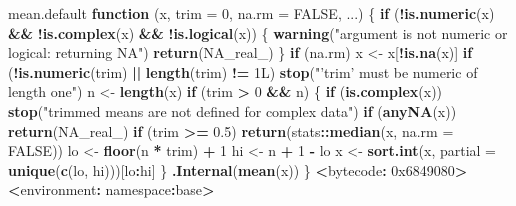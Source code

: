 \documentclass[10pt,a4paper]{book}
\newenvironment{Shaded}{\begin{snugshade}}{\end{snugshade}}
\newcommand{\KeywordTok}[1]{\textcolor[rgb]{0.13,0.29,0.53}{\textbf{#1}}}
\newcommand{\DataTypeTok}[1]{\textcolor[rgb]{0.13,0.29,0.53}{#1}}
\newcommand{\DecValTok}[1]{\textcolor[rgb]{0.00,0.00,0.81}{#1}}
\newcommand{\FloatTok}[1]{\textcolor[rgb]{0.00,0.00,0.81}{#1}}
\newcommand{\StringTok}[1]{\textcolor[rgb]{0.31,0.60,0.02}{#1}}
\newcommand{\OtherTok}[1]{\textcolor[rgb]{0.56,0.35,0.01}{#1}}
\newcommand{\ControlFlowTok}[1]{\textcolor[rgb]{0.13,0.29,0.53}{\textbf{#1}}}
\newcommand{\OperatorTok}[1]{\textcolor[rgb]{0.81,0.36,0.00}{\textbf{#1}}}
\newcommand{\ErrorTok}[1]{\textcolor[rgb]{0.64,0.00,0.00}{\textbf{#1}}}
\newcommand{\NormalTok}[1]{#1}
\begin{document}
\begin{Shaded}
\begin{Highlighting}[]
\NormalTok{mean.default}
\ControlFlowTok{function}\NormalTok{ (x, }\DataTypeTok{trim =} \DecValTok{0}\NormalTok{, }\DataTypeTok{na.rm =} \OtherTok{FALSE}\NormalTok{, ...) }
\NormalTok{\{}
    \ControlFlowTok{if}\NormalTok{ (}\OperatorTok{!}\KeywordTok{is.numeric}\NormalTok{(x) }\OperatorTok{&&}\StringTok{ }\OperatorTok{!}\KeywordTok{is.complex}\NormalTok{(x) }\OperatorTok{&&}\StringTok{ }\OperatorTok{!}\KeywordTok{is.logical}\NormalTok{(x)) \{}
        \KeywordTok{warning}\NormalTok{(}\StringTok{"argument is not numeric or logical: returning NA"}\NormalTok{)}
        \KeywordTok{return}\NormalTok{(}\OtherTok{NA_real_}\NormalTok{)}
\NormalTok{    \}}
    \ControlFlowTok{if}\NormalTok{ (na.rm) }
\NormalTok{        x <-}\StringTok{ }\NormalTok{x[}\OperatorTok{!}\KeywordTok{is.na}\NormalTok{(x)]}
    \ControlFlowTok{if}\NormalTok{ (}\OperatorTok{!}\KeywordTok{is.numeric}\NormalTok{(trim) }\OperatorTok{||}\StringTok{ }\KeywordTok{length}\NormalTok{(trim) }\OperatorTok{!=}\StringTok{ }\NormalTok{1L) }
        \KeywordTok{stop}\NormalTok{(}\StringTok{"'trim' must be numeric of length one"}\NormalTok{)}
\NormalTok{    n <-}\StringTok{ }\KeywordTok{length}\NormalTok{(x)}
    \ControlFlowTok{if}\NormalTok{ (trim }\OperatorTok{>}\StringTok{ }\DecValTok{0} \OperatorTok{&&}\StringTok{ }\NormalTok{n) \{}
        \ControlFlowTok{if}\NormalTok{ (}\KeywordTok{is.complex}\NormalTok{(x)) }
            \KeywordTok{stop}\NormalTok{(}\StringTok{"trimmed means are not defined for complex data"}\NormalTok{)}
        \ControlFlowTok{if}\NormalTok{ (}\KeywordTok{anyNA}\NormalTok{(x)) }
            \KeywordTok{return}\NormalTok{(}\OtherTok{NA_real_}\NormalTok{)}
        \ControlFlowTok{if}\NormalTok{ (trim }\OperatorTok{>=}\StringTok{ }\FloatTok{0.5}\NormalTok{) }
            \KeywordTok{return}\NormalTok{(stats}\OperatorTok{::}\KeywordTok{median}\NormalTok{(x, }\DataTypeTok{na.rm =} \OtherTok{FALSE}\NormalTok{))}
\NormalTok{        lo <-}\StringTok{ }\KeywordTok{floor}\NormalTok{(n }\OperatorTok{*}\StringTok{ }\NormalTok{trim) }\OperatorTok{+}\StringTok{ }\DecValTok{1}
\NormalTok{        hi <-}\StringTok{ }\NormalTok{n }\OperatorTok{+}\StringTok{ }\DecValTok{1} \OperatorTok{-}\StringTok{ }\NormalTok{lo}
\NormalTok{        x <-}\StringTok{ }\KeywordTok{sort.int}\NormalTok{(x, }\DataTypeTok{partial =} \KeywordTok{unique}\NormalTok{(}\KeywordTok{c}\NormalTok{(lo, hi)))[lo}\OperatorTok{:}\NormalTok{hi]}
\NormalTok{    \}}
    \KeywordTok{.Internal}\NormalTok{(}\KeywordTok{mean}\NormalTok{(x))}
\NormalTok{\}}
\OperatorTok{<}\NormalTok{bytecode}\OperatorTok{:}\StringTok{ }\DecValTok{0x6849080}\OperatorTok{>}
\ErrorTok{<}\NormalTok{environment}\OperatorTok{:}\StringTok{ }\NormalTok{namespace}\OperatorTok{:}\NormalTok{base}\OperatorTok{>}
\end{Highlighting}
\end{Shaded}
\end{document}
